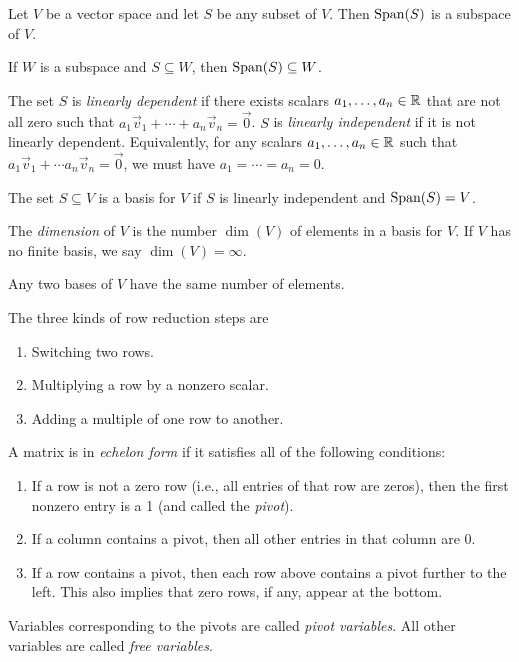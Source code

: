 \begin{theorem}
	Let $V$ be a vector space and let $S$ be any subset of $V$. Then
	$\text{Span}(S)$ is a subspace of $V$.
\end{theorem}

\begin{theorem}
	If $W$ is a subspace and $S \subseteq W$, then $\text{Span}(S) \subseteq W$.
\end{theorem}

\begin{definition}
	The set $S$ is \emph{linearly dependent} if there exists scalars $a_1, \dots,
	a_n \in {\mathbb{R}}$ that are not all zero such that $a_1 \vec{v}_1 + \cdots + a_n
	\vec{v}_n = \vec{0}$. $S$ is \emph{linearly independent} if it is not
	linearly dependent. Equivalently, for any scalars $a_1, \dots, a_n \in {\mathbb{R}}$
	such that $a_1 \vec{v}_1 + \cdots a_n \vec{v}_n = \vec{0}$, we must have
	$a_1 = \cdots = a_n = 0$.
\end{definition}

\begin{definition}
	The set $S \subseteq V$ is a basis for $V$ if $S$ is linearly independent
	and $\text{Span}(S) = V$.
\end{definition}

\begin{definition}
	The \emph{dimension} of $V$ is the number $\dim(V)$ of elements in a basis
	for $V$. If $V$ has no finite basis, we say $\dim(V) = \infty$.
\end{definition}

\begin{theorem}
	Any two bases of $V$ have the same number of elements.
\end{theorem}

\begin{fact}
	The three kinds of row reduction steps are
	\begin{enumerate}
		\item Switching two rows.
		\item Multiplying a row by a nonzero scalar.
		\item Adding a multiple of one row to another.
	\end{enumerate}
\end{fact}

\begin{definition}
	A matrix is in \emph{echelon form} if it satisfies all of the following
	conditions:
	\begin{enumerate}
		\item If a row is not a zero row (i.e., all entries of that row are zeros),
			then the first nonzero entry is a 1 (and called the \emph{pivot}).
		\item If a column contains a pivot, then all other entries in that column
			are 0.
		\item If a row contains a pivot, then each row above contains a pivot
			further to the left. This also implies that zero rows, if any, appear at
			the bottom.
	\end{enumerate}
	Variables corresponding to the pivots are called \emph{pivot variables}.
	All other variables are called \emph{free variables}.
\end{definition}

